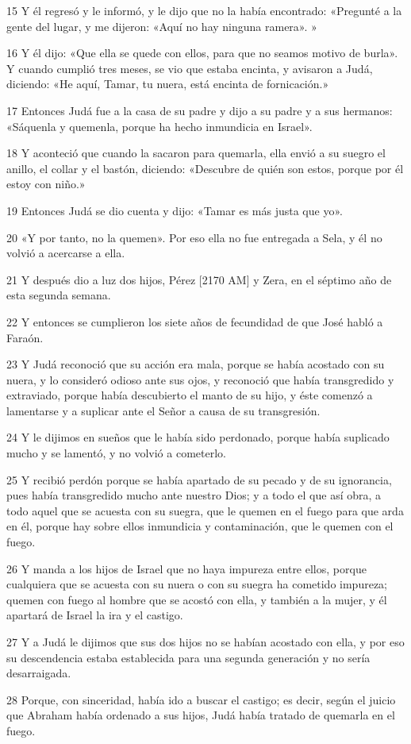 \par 15 Y él regresó y le informó, y le dijo que no la había encontrado: «Pregunté a la gente del lugar, y me dijeron: «Aquí no hay ninguna ramera». »
\par 16 Y él dijo: «Que ella se quede con ellos, para que no seamos motivo de burla». Y cuando cumplió tres meses, se vio que estaba encinta, y avisaron a Judá, diciendo: «He aquí, Tamar, tu nuera, está encinta de fornicación.»
\par 17 Entonces Judá fue a la casa de su padre y dijo a su padre y a sus hermanos: «Sáquenla y quemenla, porque ha hecho inmundicia en Israel».
\par 18 Y aconteció que cuando la sacaron para quemarla, ella envió a su suegro el anillo, el collar y el bastón, diciendo: «Descubre de quién son estos, porque por él estoy con niño.»
\par 19 Entonces Judá se dio cuenta y dijo: «Tamar es más justa que yo».
\par 20 «Y por tanto, no la quemen». Por eso ella no fue entregada a Sela, y él no volvió a acercarse a ella.
\par 21 Y después dio a luz dos hijos, Pérez [2170 AM] y Zera, en el séptimo año de esta segunda semana.
\par 22 Y entonces se cumplieron los siete años de fecundidad de que José habló a Faraón.
\par 23 Y Judá reconoció que su acción era mala, porque se había acostado con su nuera, y lo consideró odioso ante sus ojos, y reconoció que había transgredido y extraviado, porque había descubierto el manto de su hijo, y éste comenzó a lamentarse y a suplicar ante el Señor a causa de su transgresión.
\par 24 Y le dijimos en sueños que le había sido perdonado, porque había suplicado mucho y se lamentó, y no volvió a cometerlo.
\par 25 Y recibió perdón porque se había apartado de su pecado y de su ignorancia, pues había transgredido mucho ante nuestro Dios; y a todo el que así obra, a todo aquel que se acuesta con su suegra, que le quemen en el fuego para que arda en él, porque hay sobre ellos inmundicia y contaminación, que le quemen con el fuego.
\par 26 Y manda a los hijos de Israel que no haya impureza entre ellos, porque cualquiera que se acuesta con su nuera o con su suegra ha cometido impureza; quemen con fuego al hombre que se acostó con ella, y también a la mujer, y él apartará de Israel la ira y el castigo.
\par 27 Y a Judá le dijimos que sus dos hijos no se habían acostado con ella, y por eso su descendencia estaba establecida para una segunda generación y no sería desarraigada.
\par 28 Porque, con sinceridad, había ido a buscar el castigo; es decir, según el juicio que Abraham había ordenado a sus hijos, Judá había tratado de quemarla en el fuego.

